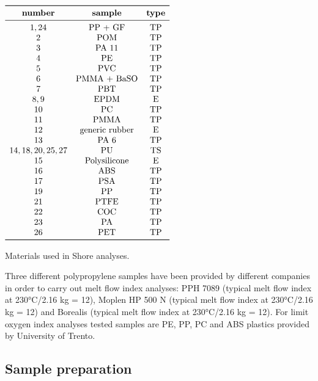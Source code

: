 \documentclass[a4paper, 11pt]{article}
\begin{document}
\begin{table}[htp]
	\centering
	$
	\begin{array}{ccc}
	\toprule
	\textbf{number} & \textbf{sample} & \textbf{type} \\
	\midrule
	1,24 & \text{PP + GF} & \text{TP}\\
	2 & \text{POM} & \text{TP}\\
	3 & \text{PA 11} & \text{TP}\\
	4 & \text{PE} & \text{TP}\\
	5 & \text{PVC} & \text{TP}\\
	6 & \text{PMMA + BaSO} & \text{TP}\\
	7 & \text{PBT} & \text{TP}\\
	8,9 & \text{EPDM} & \text{E}\\
    10 & \text{PC} & \text{TP}\\
	11 & \text{PMMA} & \text{TP}\\
	12 & \text{generic rubber} & \text{E}\\
	13 & \text{PA 6} & \text{TP}\\
	14,18,20,25,27 & \text{PU} & \text{TS}\\
	15 & \text{Polysilicone} & \text{E}\\
	16 & \text{ABS} & \text{TP}\\
	17 & \text{PSA} & \text{TP}\\
	19 & \text{PP} & \text{TP}\\
	21 & \text{PTFE} & \text{TP}\\
	22 & \text{COC} & \text{TP}\\
	23 & \text{PA} & \text{TP}\\
	26 & \text{PET} & \text{TP}\\
	\bottomrule
	\end{array}
	$
	\caption{Materials used in Shore analyses.}
	\label{tab:polymers}
\end{table}
Three different polypropylene samples have been provided by different companies in order to carry out melt flow index analyses: PPH 7089 (typical melt flow index at 230°C/2.16 kg = 12), Moplen HP 500 N (typical melt flow index at 230°C/2.16 kg = 12) and Borealis (typical melt flow index at 230°C/2.16 kg = 12). For limit oxygen index analyses tested samples are PE, PP, PC and ABS plastics provided by University of Trento. 

\subsection{Sample preparation}
\end{document}
